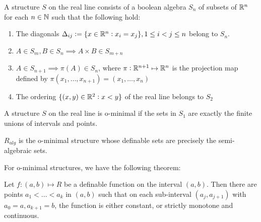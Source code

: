 \begin{definition}[Structure]
    \label{def:structure}
    A structure $S$ on the real line consists of a boolean algebra $S_n$ of subsets of $\mathbb{R}^n$ for each $n\in\mathbb{N}$ such that the following hold:
    \begin{enumerate}
        \item The diagonals $\Delta_{ij} := \{x\in\mathbb{R}^n: x_i=x_j\}, 1\leq i<j\leq n$ belong to $S_n$.
        \item $A\in S_m, B\in S_n\implies A\times B\in S_{m+n}$
        \item $A\in S_{n+1}\implies\pi(A)\in S_n$, where $\pi:\mathbb{R}^{n+1}\mapsto\mathbb{R}^n$ is the projection map defined by $\pi(x_1,\dots,x_{n+1}) = (x_1,\dots,x_n)$
        \item The ordering $\{(x,y)\in\mathbb{R}^2: x < y\}$ of the real line belongs to $S_2$
    \end{enumerate}
\end{definition}

\begin{definition}
    \label{def:o-minimal-structure}
    A structure $S$ on the real line is o-minimal if the sets in $S_1$ are exactly the finite unions of intervals and points.
\end{definition}

\begin{definition}[$R_{alg}$]
    \label{def:ralg}
    $R_{alg}$ is the o-minimal structure whose definable sets are precisely the semi-algebraic sets.
\end{definition}

For o-minimal structures, we have the following theorem:
\begin{theorem}[Monotinicity]
    \label{thm:monotonicity}
    Let $f:(a,b)\mapsto R$ be a definable function on the interval $(a,b).$ Then there are points $a_1 < ... < a_k$ in $(a,b)$ such that on each sub-interval $(a_j, a_{j+1})$ with $a_0 = a, a_{k+1} = b$, the function is either constant, or strictly monotone and continuous.
\end{theorem}

